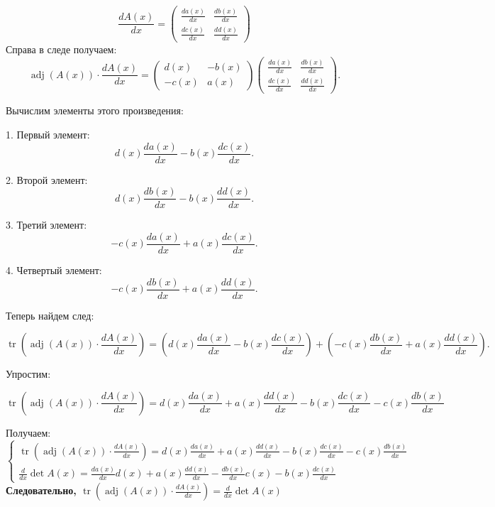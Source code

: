 \documentclass[a4paper]{article}
\newcommand{\case}[1]{\begin{cases} #1 \end{cases}}
\begin{document}
\begin{enumerate}
    $$
    \frac{d A(x)}{d x} = \begin{pmatrix} \frac{d a(x)}{dx} & \frac{d b(x)}{dx} \\ \frac{d c(x)}{dx} & \frac{d d(x)}{dx} \end{pmatrix}
    $$
    Справа в следе получаем:
    $$
    \operatorname{adj}(A(x)) \cdot \frac{d A(x)}{d x} = \begin{pmatrix} d(x) & -b(x) \\ -c(x) & a(x) \end{pmatrix} \begin{pmatrix} \frac{d a(x)}{dx} & \frac{d b(x)}{dx} \\ \frac{d c(x)}{dx} & \frac{d d(x)}{dx} \end{pmatrix}.
    $$
    
    Вычислим элементы этого произведения:

    1. Первый элемент:
    $$
    d(x) \frac{d a(x)}{dx} - b(x) \frac{d c(x)}{dx}.
    $$

    2. Второй элемент:
    $$
    d(x) \frac{d b(x)}{dx} - b(x) \frac{d d(x)}{dx}.
    $$

    3. Третий элемент:
    $$
    -c(x) \frac{d a(x)}{dx} + a(x) \frac{d c(x)}{dx}.
    $$

    4. Четвертый элемент:
    $$
    -c(x) \frac{d b(x)}{dx} + a(x) \frac{d d(x)}{dx}.
    $$
        
    Теперь найдем след:

    $$
    \operatorname{tr}\left(\operatorname{adj}(A(x)) \cdot \frac{d A(x)}{d x}\right) = \left(d(x) \frac{d a(x)}{dx} - b(x) \frac{d c(x)}{dx}\right) + \left(-c(x) \frac{d b(x)}{dx} + a(x) \frac{d d(x)}{dx}\right).
    $$
    
    Упростим:

    $$
    \operatorname{tr}\left(\operatorname{adj}(A(x)) \cdot \frac{d A(x)}{d x}\right) = d(x) \frac{d a(x)}{dx} + a(x) \frac{d d(x)}{dx} - b(x) \frac{d c(x)}{dx} - c(x) \frac{d b(x)}{dx}
    $$

    Получаем:
    $$
    \case{
        \operatorname{tr}\left(\operatorname{adj}(A(x)) \cdot \frac{d A(x)}{d x}\right) = d(x) \frac{d a(x)}{dx} + a(x) \frac{d d(x)}{dx} - b(x) \frac{d c(x)}{dx} - c(x) \frac{d b(x)}{dx} \\
        \frac{d}{dx} \operatorname{det} A(x) = \frac{d a(x)}{dx} d(x) + a(x) \frac{d d(x)}{dx} - \frac{d b(x)}{dx} c(x) - b(x) \frac{d c(x)}{dx}
    }
    $$
    \textbf{Следовательно, $\operatorname{tr}\left(\operatorname{adj}(A(x)) \cdot \frac{d A(x)}{d x}\right) = \frac{d}{dx} \operatorname{det} A(x)$}



\end{enumerate}
\end{document}

